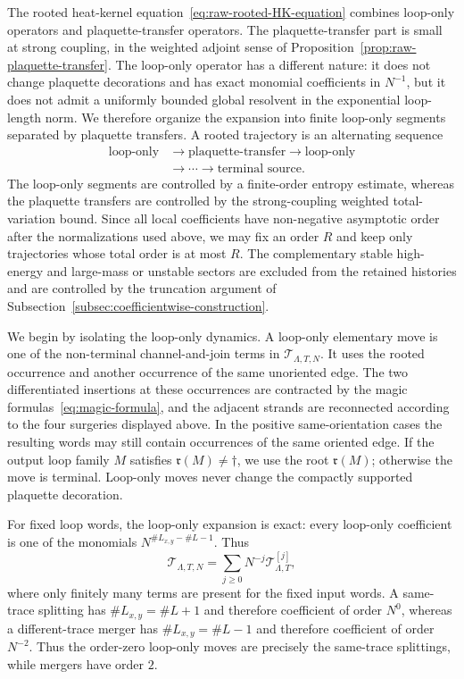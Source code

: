\documentclass[11pt,a4paper,reqno]{amsart}
\theoremstyle{definition}
\theoremstyle{remark}
\begin{document}
The rooted heat-kernel equation~\eqref{eq:raw-rooted-HK-equation} combines loop-only operators and plaquette-transfer operators. The plaquette-transfer part is small at strong coupling, in the weighted adjoint sense of Proposition~\ref{prop:raw-plaquette-transfer}. The loop-only operator has a different nature: it does not change plaquette decorations and has exact monomial coefficients in \(N^{-1}\), but it does not admit a uniformly bounded global resolvent in the exponential loop-length norm. We therefore organize the expansion into finite loop-only segments separated by plaquette transfers. A rooted trajectory is an alternating sequence
\[
\begin{aligned}
\text{loop-only}
&\longrightarrow \text{plaquette-transfer}
\longrightarrow \text{loop-only}\\
&\longrightarrow\cdots\longrightarrow \text{terminal source}.
\end{aligned}
\]
The loop-only segments are controlled by a finite-order entropy estimate, whereas the plaquette transfers are controlled by the strong-coupling weighted total-variation bound. Since all local coefficients have non-negative asymptotic order after the normalizations used above, we may fix an order \(R\) and keep only trajectories whose total order is at most \(R\). The complementary stable high-energy and large-mass or unstable sectors are excluded from the retained histories and are controlled by the truncation argument of Subsection~\ref{subsec:coefficientwise-construction}.

We begin by isolating the loop-only dynamics. A loop-only elementary move is one of the non-terminal channel-and-join terms in $\mathcal T_{\Lambda,T,N}$.  It uses the rooted occurrence and another occurrence of the same unoriented edge. The two differentiated insertions at these occurrences are contracted by the magic formulas~\eqref{eq:magic-formula}, and the adjacent strands are reconnected according to the four surgeries displayed above.  In the positive same-orientation cases the resulting words may still contain occurrences of the same oriented edge.  If the output loop family $M$ satisfies $\mathfrak r(M)\ne\dagger$, we use the root $\mathfrak r(M)$; otherwise the move is terminal.  Loop-only moves never change the compactly supported plaquette decoration.

For fixed loop words, the loop-only expansion is exact: every loop-only coefficient is one of the monomials $N^{\#L_{x,y}-\#L-1}$.  Thus
\begin{equation}\label{eq:T-Laurent}
\mathcal T_{\Lambda,T,N}=\sum_{j\ge0}N^{-j}\mathcal T^{[j]}_{\Lambda,T},
\end{equation}
where only finitely many terms are present for the fixed input words. A same-trace splitting has $\#L_{x,y}=\#L+1$ and therefore coefficient of order $N^0$, whereas a different-trace merger has $\#L_{x,y}=\#L-1$ and therefore coefficient of order $N^{-2}$. Thus the order-zero loop-only moves are precisely the same-trace splittings, while mergers have order $2$.
\end{document}
